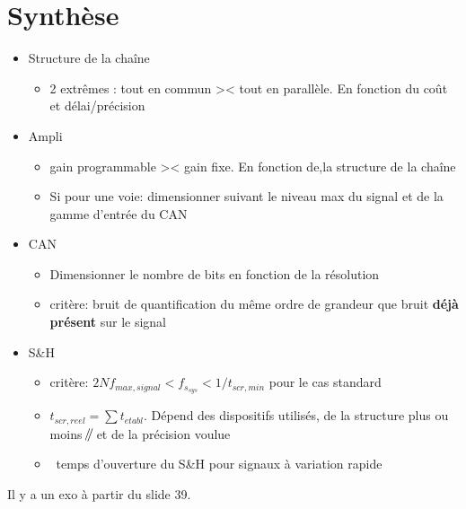 \section{Synthèse}
\begin{itemize}
	\item Structure de la chaîne
	\begin{itemize}
		\item 2 extrêmes : tout en commun >< tout en parallèle. En fonction du coût et délai/précision
	\end{itemize}
	\item Ampli
	\begin{itemize}
		\item gain programmable >< gain fixe. En fonction de,la structure de la chaîne
		\item Si pour une voie: dimensionner suivant le niveau max du signal et de la gamme d'entrée du CAN
	\end{itemize}
	\item CAN
	\begin{itemize}
		\item Dimensionner le nombre de bits en fonction de la résolution
		\item critère: bruit de quantification du même ordre de grandeur que bruit \textbf{déjà présent} sur le signal
	\end{itemize}
	\item S\&H
	\begin{itemize}
		\item critère: \(2Nf_{max,signal}<f_{s_{sys}}<1/t_{scr,min}\) pour le cas standard
		\item \(t_{scr,reel}=\sum t_{etabl}\). Dépend des dispositifs utilisés, de la structure plus ou moins \(\mathbin{\!/\mkern-5mu/\!}\) et de la précision voulue
		\item \danger\ temps d'ouverture du S\&H pour signaux à variation rapide
	\end{itemize}
\end{itemize}
Il y a un exo à partir du slide 39.